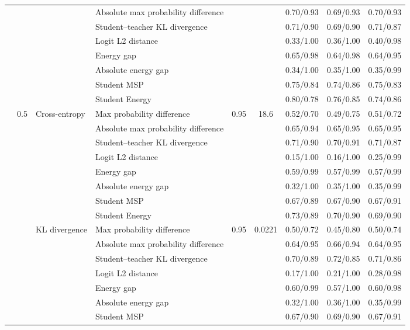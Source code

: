 \documentclass[border=2pt]{standalone}
\begin{document}
\begin{tabular}{llllccccc}
 &  &  & Absolute max probability difference &  &  & 0.70/0.93 & 0.69/0.93 & 0.70/0.93 \\
 &  &  & Student--teacher KL divergence &  &  & 0.71/0.90 & 0.69/0.90 & 0.71/0.87 \\
 &  &  & Logit L2 distance &  &  & 0.33/1.00 & 0.36/1.00 & 0.40/0.98 \\
 &  &  & Energy gap &  &  & 0.65/0.98 & 0.64/0.98 & 0.64/0.95 \\
 &  &  & Absolute energy gap &  &  & 0.34/1.00 & 0.35/1.00 & 0.35/0.99 \\
 &  &  & Student MSP &  &  & 0.75/0.84 & 0.74/0.86 & 0.75/0.83 \\
 &  &  & Student Energy &  &  & 0.80/0.78 & 0.76/0.85 & 0.74/0.86 \\
\addlinespace
 & 0.5 & Cross-entropy & Max probability difference & 0.95 & 18.6 & 0.52/0.70 & 0.49/0.75 & 0.51/0.72 \\
 &  &  & Absolute max probability difference &  &  & 0.65/0.94 & 0.65/0.95 & 0.65/0.95 \\
 &  &  & Student--teacher KL divergence &  &  & 0.71/0.90 & 0.70/0.91 & 0.71/0.87 \\
 &  &  & Logit L2 distance &  &  & 0.15/1.00 & 0.16/1.00 & 0.25/0.99 \\
 &  &  & Energy gap &  &  & 0.59/0.99 & 0.57/0.99 & 0.57/0.99 \\
 &  &  & Absolute energy gap &  &  & 0.32/1.00 & 0.35/1.00 & 0.35/0.99 \\
 &  &  & Student MSP &  &  & 0.67/0.89 & 0.67/0.90 & 0.67/0.91 \\
 &  &  & Student Energy &  &  & 0.73/0.89 & 0.70/0.90 & 0.69/0.90 \\
\addlinespace
 &  & KL divergence & Max probability difference & 0.95 & 0.0221 & 0.50/0.72 & 0.45/0.80 & 0.50/0.74 \\
 &  &  & Absolute max probability difference &  &  & 0.64/0.95 & 0.66/0.94 & 0.64/0.95 \\
 &  &  & Student--teacher KL divergence &  &  & 0.70/0.89 & 0.72/0.85 & 0.71/0.86 \\
 &  &  & Logit L2 distance &  &  & 0.17/1.00 & 0.21/1.00 & 0.28/0.98 \\
 &  &  & Energy gap &  &  & 0.60/0.99 & 0.57/1.00 & 0.60/0.98 \\
 &  &  & Absolute energy gap &  &  & 0.32/1.00 & 0.36/1.00 & 0.35/0.99 \\
 &  &  & Student MSP &  &  & 0.67/0.90 & 0.69/0.90 & 0.67/0.91 \\

\end{tabular}
\end{document}
